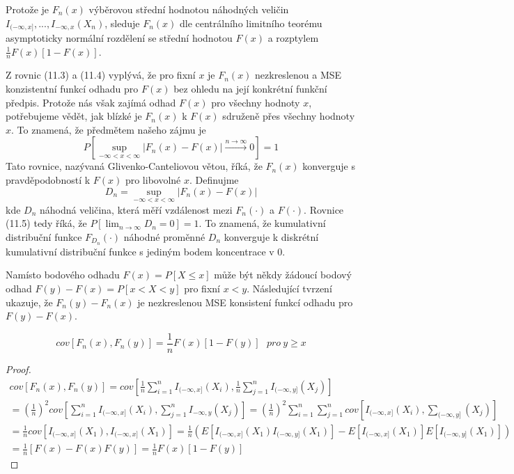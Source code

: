 Protože je $F_n(x)$ výběrovou střední hodnotou náhodných veličin $I_{(-\infty, x]}, ..., I_{-\infty, x}(X_n)$, sleduje $F_n(x)$ dle centrálního limitního teorému
asymptoticky normální rozdělení se střední hodnotou $F(x)$ a rozptylem $\frac{1}{n}F(x)[1 - F(x)]$.

Z rovnic (11.3) a (11.4) vyplývá, že pro fixní $x$ je $F_n(x)$ nezkreslenou a MSE konzistentní funkcí odhadu pro $F(x)$ bez ohledu na její konkrétní funkční předpis. Protože nás však zajímá odhad $F(x)$ pro všechny hodnoty $x$, potřebujeme vědět, jak blízké je $F_n(x)$ k $F(x)$ sdruženě přes všechny hodnoty $x$. To znamená, že předmětem našeho zájmu je
\begin{equation*}
P[\sup_{-\infty < x < \infty} |F_n(x) - F(x)| \xrightarrow{n \rightarrow \infty} 0] = 1
\end{equation*}
Tato rovnice, nazývaná Glivenko-Canteliovou větou, říká, že $F_n(x)$ konverguje s pravděpodobností k $F(x)$ pro libovolné $x$. Definujme
\begin{equation*}
D_n = \sup_{-\infty < x < \infty}|F_n(x) - F(x)|
\end{equation*}
kde $D_n$ náhodná veličina, která měří vzdálenost mezi $F_n(\cdot)$ a $F(\cdot)$. Rovnice (11.5) tedy říká, že $P[\lim_{n \rightarrow \infty} D_n = 0] = 1$. To znamená, že kumulativní distribuční funkce $F_{D_n}(\cdot)$ náhodné proměnné $D_n$ konverguje k diskrétní kumulativní distribuční funkce s jediným bodem koncentrace v 0.

Namísto bodového odhadu $F(x) = P[X \le x]$ může být někdy žádoucí bodový odhad $F(y) - F(x) = P[x < X < y]$ pro fixní $x < y$. Následující tvrzení ukazuje, že $F_n(y) - F_n(x)$ je nezkreslenou MSE konsistení funkcí odhadu pro $F(y) - F(x)$.

\begin{corollary}
\begin{equation}
cov[F_n(x), F_n(y)] = \frac{1}{n}F(x)[1 - F(y)] ~~~ \textit{pro} ~ y \ge x
\end{equation}
\end{corollary}

\begin{proof}
\begin{multline*}
cov[F_n(x), F_n(y)] = cov\left[\frac{1}{n}\sum_{i = 1}^n I_{(-\infty, x]}(X_i), \frac{1}{n}\sum_{j = 1}^n I_{(-\infty, y]}(X_j)\right]\\
= \left(\frac{1}{n}\right)^2 cov \left[\sum_{i = 1}^n I_{(-\infty, x]}(X_i), \sum_{j = 1}^n I_{-\infty, y}(X_j)\right] = \left(\frac{1}{n}\right)^2 \sum_{i = 1}^n \sum_{j = 1}^n cov[I_{(-\infty, x]}(X_i), \sum_{(-\infty, y]}(X_j)]\\
= \frac{1}{n}cov[I_{(-\infty, x]}(X_1), I_{(-\infty, x]}(X_1)] = \frac{1}{n}\left(E[I_{(-\infty, x]}(X_1)I_{(-\infty, y]}(X_1)] - E[I_{(-\infty, x]}(X_1)]E[I_{(-\infty, y]}(X_1)]\right)\\
= \frac{1}{n}[F(x) - F(x)F(y)] = \frac{1}{n}F(x)[1 - F(y)]
\end{multline*}
\end{proof}

